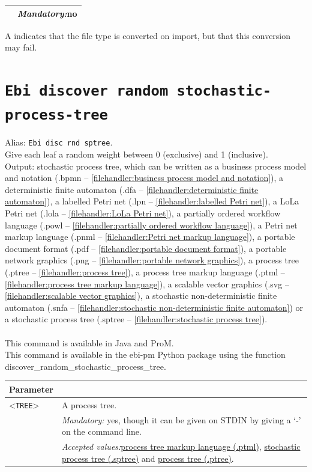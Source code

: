 {\begin{tabularx}{\linewidth}{lX}
&\textit{Mandatory:}\quad no\\
\bottomrule
\end{tabularx}
A \textdagger{} indicates that the file type is converted on import, but that this conversion may fail.
\clearpage\section{\texttt{Ebi discover random stochastic-process-tree}}
\label{command:Ebi discover random stochastic-process-tree}
Alias: \texttt{Ebi disc rnd sptree}.\\
Give each leaf a random weight between 0 (exclusive) and 1 (inclusive).\\
\noindent Output: stochastic process tree, which can be written as a business process model and notation (.bpmn -- \cref{filehandler:business process model and notation}), a deterministic finite automaton (.dfa -- \cref{filehandler:deterministic finite automaton}), a labelled Petri net (.lpn -- \cref{filehandler:labelled Petri net}), a LoLa Petri net (.lola -- \cref{filehandler:LoLa Petri net}), a partially ordered workflow language (.powl -- \cref{filehandler:partially ordered workflow language}), a Petri net markup language (.pnml -- \cref{filehandler:Petri net markup language}), a portable document format (.pdf -- \cref{filehandler:portable document format}), a portable network graphics (.png -- \cref{filehandler:portable network graphics}), a process tree (.ptree -- \cref{filehandler:process tree}), a process tree markup language (.ptml -- \cref{filehandler:process tree markup language}), a scalable vector graphics (.svg -- \cref{filehandler:scalable vector graphics}), a stochastic non-deterministic finite automaton (.snfa -- \cref{filehandler:stochastic non-deterministic finite automaton}) or a stochastic process tree (.sptree -- \cref{filehandler:stochastic process tree}).\\
\\This command is available in Java and ProM.
\\This command is available in the ebi-pm Python package using the function discover\_random\_stochastic\_process\_tree.
\begin{tabularx}{\linewidth}{lX}
\toprule
Parameter \\\midrule
<\texttt{TREE}>&A process tree.\\
&\textit{Mandatory:} \quad yes, though it can be given on STDIN by giving a `-' on the command line.\\
&\textit{Accepted values:}\quad \hyperref[filehandler:process tree markup language]{process tree markup language (.ptml)}, \hyperref[filehandler:stochastic process tree]{stochastic process tree (.sptree)} and \hyperref[filehandler:process tree]{process tree (.ptree)}.\\

\end{tabularx}}

